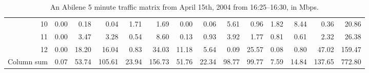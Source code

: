 \begin{sidewaystable}[htp]
\begin{tabular}[htp]{r|rrrrrrrrrrrr|r}
  10 &    0.00 &     0.18 &     0.04 &     1.71 &     1.69 &     0.00 &     0.06 &     5.61 &     0.96 &     1.82 &     8.44 &     0.36 &    20.86 \\
  11 &    0.00 &     3.47 &     3.28 &     0.54 &     8.60 &     0.13 &     0.93 &     3.92 &     1.77 &     0.81 &     0.61 &     2.32 &    26.38 \\
  12 &    0.00 &    18.20 &    16.04 &     0.83 &    34.03 &    11.18 &     5.64 &     0.09 &    25.57 &     0.08 &     0.80 &    47.02 &   159.47 \\
    \hline
      Column sum &    0.07 &    53.74 &   105.61 &    23.94 &   156.73 &    51.76 &    22.34 &    98.77 &    99.77 &     7.59 &    14.84 &   137.65 &   772.80 \\
  \end{tabular}
 \caption{An Abilene 5 minute traffic matrix from April 15th, 2004 from 16:25--16:30, in Mbps.}
  \label{tab:traffic_matrix}
\end{sidewaystable}
